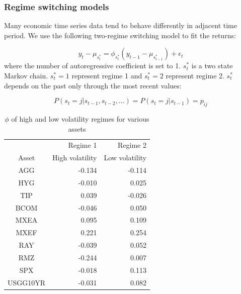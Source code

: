 \documentclass{beamer}
\newcommand\Fontviii{\fontsize{8}{9.2}\selectfont}
\begin{document}
\begin{frame}
\frametitle{Regime switching models}
\Fontviii
Many economic time series data tend to behave differently in adjacent time period. We use the following two-regime switching model to fit the returns:

\begin{equation}
y_t - \mu_{s^*_t} = \phi_{s^*_t} (y_{t-1} - \mu_{s^*_{t-1}}) + \epsilon_t
\end{equation}
where the number of autoregressive coefficient is set to 1. $s^*_t$ is a two state Markov chain. $s^*_t = 1$ represent regime 1 and $s^*_t = 2$ represent regime 2. $s^*_t$ depends on the past only through the most recent values:

\begin{equation}
P(s_t = j|s_{t-1}, s_{t-2}, \dots) = P(s_t = j|s_{t-1})  = p_{ij}
\end{equation}

\begin{table}[!h]
\centering 
\begin{tabular}{ | c || r  r | } 
 \hline
 & Regime 1  & Regime 2\\
Asset & High volatility  & Low volatility \\
  \hline \hline
AGG  & -0.134 & -0.114 \\ 
HYG & -0.010 &  0.025 \\ 
TIP &  0.039  & -0.026 \\ 
BCOM & -0.046 &  0.050 \\ 
MXEA & 0.095 & 0.109 \\ 
MXEF & 0.221 & 0.254 \\ 
RAY& -0.039  &  0.052 \\ 
RMZ & -0.244 &  0.007 \\ 
SPX & -0.018 &  0.113 \\ 
USGG10YR & -0.031 & 0.082 \\ 
 \hline
\end{tabular}
\label{table:autoCoeffRegime}
\caption{$\phi$ of high and low volatility regimes for various assets} 
\end{table}
\end{frame}

\end{document}
